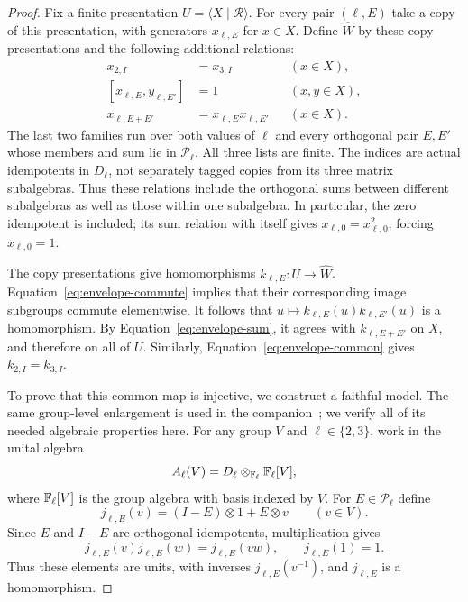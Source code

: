 \begin{proof}
Fix a finite presentation $U=\langle X\mid\mathcal R\rangle$.
For every pair $(\ell,E)$ take a copy of this presentation, with
generators $x_{\ell,E}$ for $x\in X$.  Define $\widehat W$ by these
copy presentations and the following additional relations:
\begin{align}
 x_{2,I}&=x_{3,I} &&(x\in X),\label{eq:envelope-common}\\
 [x_{\ell,E},y_{\ell,E'}]&=1 &&(x,y\in X),\label{eq:envelope-commute}\\
 x_{\ell,E+E'}&=x_{\ell,E}x_{\ell,E'} &&(x\in X).
 \label{eq:envelope-sum}
\end{align}
The last two families run over both values of $\ell$ and every
orthogonal pair $E,E'$ whose members and sum lie in
$\mathcal P_\ell$.  All three lists are finite.  The indices are actual
idempotents in $D_\ell$, not separately tagged copies from its three
matrix subalgebras.  Thus these relations include the orthogonal sums
between different subalgebras as well as those within one subalgebra.
In particular, the zero idempotent is included; its sum relation with
itself gives $x_{\ell,0}=x_{\ell,0}^2$, forcing
$x_{\ell,0}=1$.

The copy presentations give homomorphisms $k_{\ell,E}:U\to\widehat W$.
Equation~\eqref{eq:envelope-commute} implies that their corresponding
image subgroups commute elementwise.  It follows that
$u\mapsto k_{\ell,E}(u)k_{\ell,E'}(u)$ is a homomorphism.  By
Equation~\eqref{eq:envelope-sum}, it agrees with $k_{\ell,E+E'}$ on
$X$, and therefore on all of $U$.  Similarly,
Equation~\eqref{eq:envelope-common} gives $k_{2,I}=k_{3,I}$.

To prove that this common map is injective, we construct a faithful
model.  The same group-level enlargement is used in the
companion~\cite[Section~3.1]{OpenAIOvergroups}; we verify all of its needed algebraic
properties here.  For any group $V$
and $\ell\in\{2,3\}$, work in the unital algebra
\[
 A_\ell(V)=D_\ell\otimes_{\mathbb F_\ell}\mathbb F_\ell[V],
\]
where $\mathbb F_\ell[V]$ is the group algebra with basis indexed by $V$.
For $E\in\mathcal P_\ell$ define
\begin{equation}\label{eq:envelope-model}
 j_{\ell,E}(v)=(I-E)\otimes1+E\otimes v
 \qquad(v\in V).
\end{equation}
Since $E$ and $I-E$ are orthogonal idempotents, multiplication gives
\[
 j_{\ell,E}(v)j_{\ell,E}(w)=j_{\ell,E}(vw),
 \qquad j_{\ell,E}(1)=1.
\]
Thus these elements are units, with inverses $j_{\ell,E}(v^{-1})$,
and $j_{\ell,E}$ is a homomorphism.


\end{proof}
